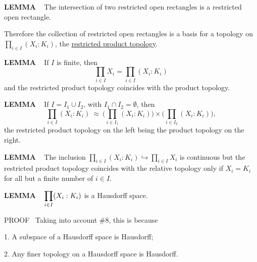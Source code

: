 \begin{x}{\small\bf LEMMA} \ %
The intersection of two restricted open rectangles is a restricted open rectangle.
\end{x}

\vspace{0.1cm}


Therefore the collection of restricted open rectangles is a basis for a topology on $\prod\limits_{i \in I} (X_i : K_i)$, the \underline{restricted product topology}.  

\vspace{0.2cm}

\begin{x}{\small\bf LEMMA} \ %
If $I$ is finite, then
\[
\prod_{i \in I} X_i = \prod_{i \in I} (X_i : K_i)
\]
and the restricted product topology coincides with the product topology.
\end{x}

\vspace{0.1cm}


\begin{x}{\small\bf LEMMA} \ %
If $I = I_1 \cup I_2$, with $I_1 \cap I_2 = \emptyset$, then
\[
 \prod_{i \in I} (X_i : K_i) \ \approx \  \bigl( \prod_{i \in I_1} (X_i : K_i) \bigr) \times \bigl(\prod_{i \in I_2} (X_i : K_i)\bigr),
\]
the restricted product topology on the left being the product topology on the right.
\end{x}

\vspace{0.1cm}


\begin{x}{\small\bf LEMMA} \ %
The inclusion $\prod\limits_{i \in I} (X_i : K_i)  \hookrightarrow \prod\limits_{i \in I} X_i$ is continuous but the restricted product topology coincides with the relative topology only if $X_i = K_i$ for all but a finite number of $i \in I$.
\end{x}
\vspace{0.1cm}

\begin{x}{\small\bf LEMMA} \ %
$\displaystyle\prod\limits_{i \in I} (X_i : K_i)$ is a Hausdorff space.

\vspace{0.1cm}

PROOF \   
Taking into account \#8, this is because

1. A subspace of a Hausdorff space is Hausdorff;

2. Any finer topology on a Hausdorff space is Hausdorff.
\end{x}

